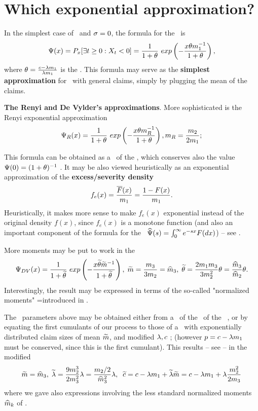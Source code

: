 \section{Which exponential   approximation? }
In the simplest case of \expoj\ and $\sigma=0$, the  formula for the \rp\ is
\begin{equation} \la{Ruiex}
\Rui(x) = P_x[ \exists t \geq 0: X_t < 0]= \frac{1}{1+  {\th}} \ exp \left( - \frac{x  {\th} m_1^{-1}}{1+  {\th}} \right),
\end{equation}
where $\theta=\frac{c -\lambda m_1}{\lambda m_1}$ is the \lc.
This formula may serve  as the {\bf simplest approximation} for \procs\ with general claims, simply by plugging the mean of the claims.


{\bf The Renyi and De Vylder's approximations}.
More sophisticated is the Renyi exponential
approximation
\begin{equation*}
\Psi_R(x) =  \frac{1}{1+  {\theta}} \ exp \left( - \frac{x  {\theta} m_R^{-1}}{1+  {\theta}} \right), m_R=\frac{m_{2}}{2m_{1}};
\end{equation*}

This formula can  be obtained as a \tPd\   of the \LT, which conserves also the value $\Psi(0)=(1+\theta)^{-1}$ \cite{AP14}. It may be also viewed heuristically as an exponential
approximation of the {\bf excess/severity density} $$f_e(x)=\frac{\overline F(x)}{m_1}=\frac{1- F(x)}{m_1}.$$ Heuristically, it makes more sense to make $f_e(x)$ exponential instead of the original density $f(x)$, since $f_e(x)$ is a monotone function (and also an important component of the \PK formula for the \LT\ $\widehat {\Psi}(s)=\int_0^\infty e^{- s x} F( dx)$) -- see \cite{ramsay1992practical,AP14}.




More moments may be put to work in the \deV
\begin{equation}
\Psi_{DV}(x) = \frac{1}{1+ \widetilde {\theta}} \ exp \left( - \frac{x \widetilde {\theta} \widetilde m^{-1}}{1+ \widetilde {\theta}} \right), \; \widetilde {m}=\frac{m_{3}}{3m_{2}}=\widehat m_{3}, \;  \widetilde {\theta} =\frac{2 m_{1}m_{3}}{3m_{2}^{2}}\theta=\frac{\widehat m_{3}}{\widehat m_{2}}\theta.
\end{equation}
Interestingly, the result may be expressed in terms of the so-called "normalized moments" =\ee  introduced in \cite{bobbio2005matching}.

The \deV\ parameters above may be obtained either from  \BEN \im a \Pd\ of the \LT\ of the \rp\ \cite{avram2011moments}, or \im by equating the first  cumulants of our process to those of a \proc\ with  exponentially distributed claim sizes of mean $\widetilde m$,  and  modified $\lambda, c$  \cite{de1978practical};  (however   $p=c -\lambda m_1$ must be conserved, since this is the first cumulant). This results -- see  -- in the modified \paras
$$\widetilde m =\widehat m_3, \;  \widetilde {\lambda}
= \frac{9 m_{2}^{3}}{2 m_{3}^{2}}\lambda=\frac{ m_2/2} { \widehat m_3^2} \lambda, \; \;  \widetilde c= c -\lambda m_1+ \widetilde {\lambda} \widetilde m= c -\lambda m_1+  \lambda \frac{ m_{2}^{2}}{2 m_{3}}$$
where we gave also expressions involving the less standard normalized moments $\widehat m_k$ of \cite{bobbio2005matching}.
\EEN

